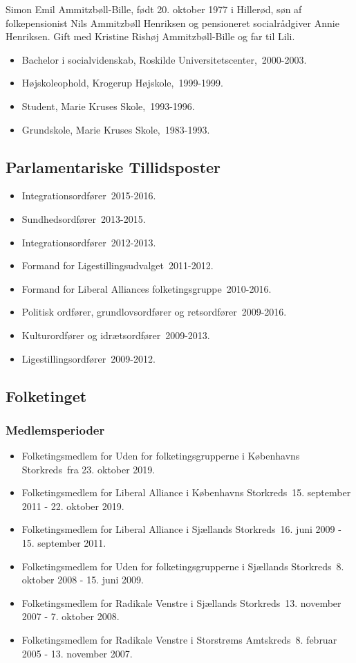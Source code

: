 \documentclass[11pt, a4paper]{awesome-cv}
\begin{document}
\makecvheader[R]
\makelettertitle
\begin{cvletter}
Simon Emil Ammitzbøll-Bille, født 20. oktober 1977 i Hillerød, søn af folkepensionist Nils Ammitzbøll Henriksen og pensioneret socialrådgiver Annie Henriksen. Gift med Kristine Rishøj Ammitzbøll-Bille og far til Lili.

\begin{itemize}
\item Bachelor i socialvidenskab, Roskilde Universitetscenter, 2000-2003.
\item Højskoleophold, Krogerup Højskole, 1999-1999.
\item Student, Marie Kruses Skole, 1993-1996.
\item Grundskole, Marie Kruses Skole, 1983-1993.
\end{itemize}
\subsection*{Parlamentariske Tillidsposter}
\begin{itemize}
\item Integrationsordfører 2015-2016.
\item Sundhedsordfører 2013-2015.
\item Integrationsordfører 2012-2013.
\item Formand for Ligestillingsudvalget 2011-2012.
\item Formand for Liberal Alliances folketingsgruppe 2010-2016.
\item Politisk ordfører, grundlovsordfører og retsordfører 2009-2016.
\item Kulturordfører og idrætsordfører 2009-2013.
\item Ligestillingsordfører 2009-2012.
\end{itemize}
\subsection*{Folketinget}
\subsubsection*{Medlemsperioder}
\begin{itemize}
\item Folketingsmedlem for Uden for folketingsgrupperne i Københavns Storkreds fra 23. oktober 2019.
\item Folketingsmedlem for Liberal Alliance i Københavns Storkreds 15. september 2011 - 22. oktober 2019.
\item Folketingsmedlem for Liberal Alliance i Sjællands Storkreds 16. juni 2009 - 15. september 2011.
\item Folketingsmedlem for Uden for folketingsgrupperne i Sjællands Storkreds 8. oktober 2008 - 15. juni 2009.
\item Folketingsmedlem for Radikale Venstre i Sjællands Storkreds 13. november 2007 - 7. oktober 2008.
\item Folketingsmedlem for Radikale Venstre i Storstrøms Amtskreds 8. februar 2005 - 13. november 2007.
\end{itemize}

\end{cvletter}
\end{document}
